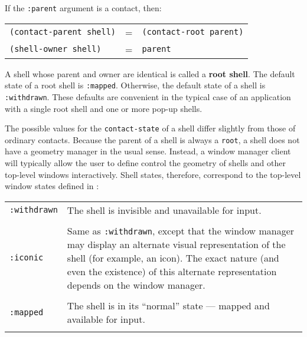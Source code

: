If the {\tt :parent} argument is a contact, then:

\begin{center}
\begin{tabular}{lll}
{\tt (contact-parent shell)} & =  & {\tt (contact-root parent)}\\
{\tt (shell-owner shell)}    & =  & {\tt parent}\\ 
\end{tabular} \end{center}

A shell whose parent and owner are identical is called a {\bf root
shell}. The default state of a root
shell is {\tt :mapped}.  Otherwise, the default state of a shell is {\tt
:withdrawn}.  These defaults are convenient in the typical case of an
application with a single root shell and one or more pop-up
shells.


The possible values for the {\tt contact-state} of a shell
differ slightly from those of ordinary contacts. Because the parent of a
shell is always a {\tt root}, a shell does not have a geometry manager
in the usual sense. Instead, a window manager client will typically allow the  user to define control the geometry
of shells and other top-level windows interactively. Shell states,
therefore, correspond to the top-level window states defined in
\cite{icccm}:

\begin{center}
\begin{tabular}{lp{3.5in}}
{\tt :withdrawn} & The shell is invisible and unavailable for input.\\
\\ 
{\tt :iconic} & Same as {\tt :withdrawn}, except that the window manager
may display an alternate visual representation of the shell (for
example, an icon). The exact nature (and even the existence) of this
alternate representation depends on the window manager.\\
\\ {\tt :mapped} & The shell is in its ``normal'' state --- mapped and
available for input.\\ \\ 
\end{tabular} \end{center}


